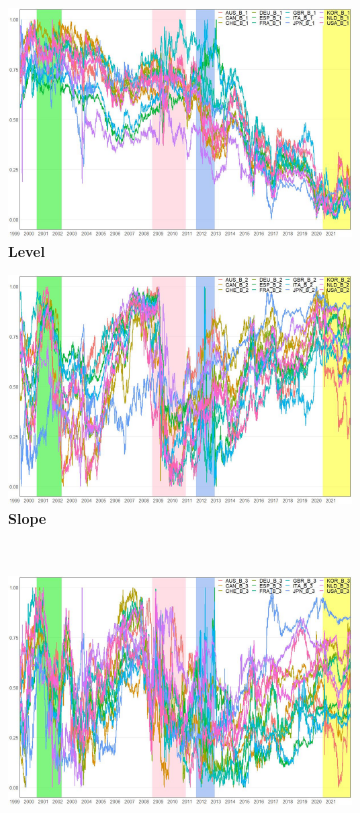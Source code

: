 \documentclass[12pt,bibliography=totoc]{article}
\begin{document}
\begin{figure}[H]
\centering

\begin{subfigure}{.5\linewidth}
\centering
\includegraphics[width=\linewidth]{Level}
\caption{\textbf{Level}}

\end{subfigure}%
\begin{subfigure}{.5\linewidth}
\centering
\includegraphics[width=\linewidth]{Slope}
\caption{\textbf{Slope}}
\end{subfigure}\\[1ex]
\begin{subfigure}{.5\linewidth}
\centering
\includegraphics[width=\linewidth]{Curvature}


\end{subfigure}
\end{figure}
\end{document}
